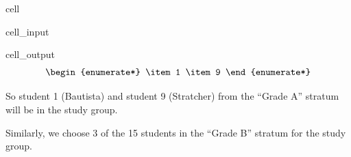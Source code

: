 \documentclass[letterpaper,10pt,english]{jupyterBook}
\begin{document}
\begin{sphinxuseclass}{cell}\begin{sphinxVerbatimInput}

\begin{sphinxuseclass}{cell_input}
\begin{sphinxVerbatim}[commandchars=\\\{\}]
\end{sphinxVerbatim}

\end{sphinxuseclass}\end{sphinxVerbatimInput}
\begin{sphinxVerbatimOutput}

\begin{sphinxuseclass}{cell_output}\begin{equation*}
\begin{split}\begin{enumerate*}
\item 1
\item 9
\end{enumerate*}\end{split}
\end{equation*}
\end{sphinxuseclass}\end{sphinxVerbatimOutput}

\end{sphinxuseclass}
\sphinxAtStartPar
So student 1 (Bautista) and student 9 (Stratcher) from the “Grade A” stratum will be in the study group.

\sphinxAtStartPar
Similarly, we choose 3 of the 15 students in the “Grade B” stratum for the study group.
\end{document}
